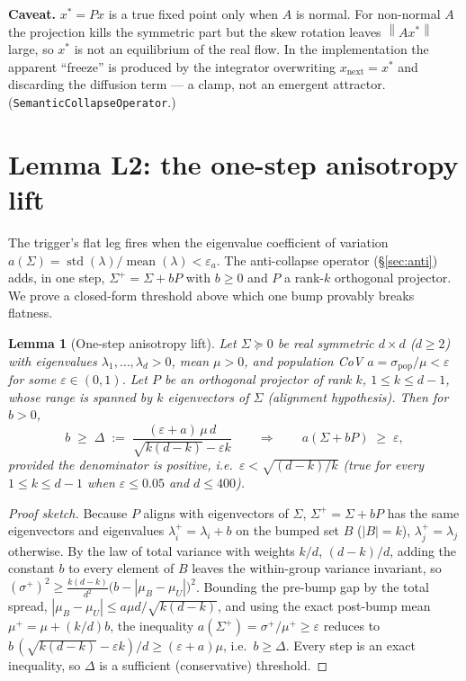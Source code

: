 \documentclass[11pt]{article}
\newtheorem{lemma}{Lemma}
\theoremstyle{definition}
\newcommand{\norm}[1]{\left\lVert#1\right\rVert}
\begin{document}
\begin{caveatbox}
\textbf{Caveat.} $x^\ast=Px$ is a true fixed point only when $A$ is normal. For non-normal
$A$ the projection kills the symmetric part but the skew rotation leaves $\norm{A x^\ast}$
large, so $x^\ast$ is not an equilibrium of the real flow. In the implementation the
apparent ``freeze'' is produced by the integrator overwriting $x_{\text{next}}=x^\ast$ and
discarding the diffusion term --- a clamp, not an emergent attractor.
(\texttt{SemanticCollapseOperator}.)
\end{caveatbox}

\section{Lemma L2: the one-step anisotropy lift}
\label{sec:l2}
The trigger's flat leg fires when the eigenvalue coefficient of variation
$a(\Sigma)=\operatorname{std}(\lambda)/\operatorname{mean}(\lambda)<\varepsilon_a$. The
anti-collapse operator (\S\ref{sec:anti}) adds, in one step, $\Sigma^+ = \Sigma + bP$ with
$b\ge0$ and $P$ a rank-$k$ orthogonal projector. We prove a closed-form threshold above
which one bump provably breaks flatness.

\begin{lemma}[One-step anisotropy lift]
\label{lem:l2}
Let $\Sigma\succeq0$ be real symmetric $d\times d$ ($d\ge2$) with eigenvalues
$\lambda_1,\dots,\lambda_d>0$, mean $\mu>0$, and population CoV $a=\sigma_{\mathrm{pop}}/\mu<\varepsilon$
for some $\varepsilon\in(0,1)$. Let $P$ be an orthogonal projector of rank $k$,
$1\le k\le d-1$, whose range is spanned by $k$ eigenvectors of $\Sigma$ (alignment
hypothesis). Then for $b>0$,
\begin{equation}
b \;\ge\; \Delta \;:=\; \frac{(\varepsilon + a)\,\mu\,d}{\sqrt{k(d-k)} - \varepsilon k}
\qquad\Longrightarrow\qquad a(\Sigma + bP) \;\ge\; \varepsilon,
\end{equation}
provided the denominator is positive, i.e.\ $\varepsilon < \sqrt{(d-k)/k}$ (true for every
$1\le k\le d-1$ when $\varepsilon\le0.05$ and $d\le400$).
\end{lemma}

\begin{proof}[Proof sketch]
Because $P$ aligns with eigenvectors of $\Sigma$, $\Sigma^+=\Sigma+bP$ has the same
eigenvectors and eigenvalues $\lambda_i^+=\lambda_i+b$ on the bumped set $B$ ($|B|=k$),
$\lambda_j^+=\lambda_j$ otherwise. By the law of total variance with weights $k/d$,
$(d-k)/d$, adding the constant $b$ to every element of $B$ leaves the within-group variance
invariant, so
$(\sigma^+)^2 \ge \tfrac{k(d-k)}{d^2}\big(b-|\mu_B-\mu_U|\big)^2$. Bounding the pre-bump gap
by the total spread, $|\mu_B-\mu_U|\le a\mu d/\sqrt{k(d-k)}$, and using the exact post-bump
mean $\mu^+=\mu+(k/d)b$, the inequality $a(\Sigma^+)=\sigma^+/\mu^+\ge\varepsilon$ reduces
to $b\,(\sqrt{k(d-k)}-\varepsilon k)/d \ge (\varepsilon+a)\mu$, i.e.\ $b\ge\Delta$. Every
step is an exact inequality, so $\Delta$ is a sufficient (conservative) threshold.
\end{proof}
\end{document}
